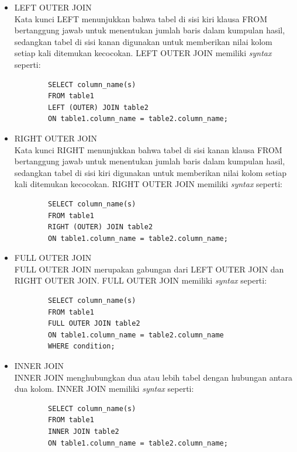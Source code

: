 \begin{itemize}
    \item LEFT OUTER JOIN \\
    Kata kunci LEFT menunjukkan bahwa tabel di sisi kiri klausa FROM bertanggung jawab untuk menentukan jumlah baris dalam kumpulan hasil, sedangkan tabel di sisi kanan digunakan untuk memberikan nilai kolom setiap kali ditemukan kecocokan. LEFT OUTER JOIN memiliki \textit{syntax} seperti:
    \begin{verbatim}
        SELECT column_name(s)
        FROM table1
        LEFT (OUTER) JOIN table2
        ON table1.column_name = table2.column_name;
    \end{verbatim}
    
    \item RIGHT OUTER JOIN \\
    Kata kunci RIGHT menunjukkan bahwa tabel di sisi kanan klausa FROM bertanggung jawab untuk menentukan jumlah baris dalam kumpulan hasil, sedangkan tabel di sisi kiri digunakan untuk memberikan nilai kolom setiap kali ditemukan kecocokan. RIGHT OUTER JOIN memiliki \textit{syntax} seperti:
    \begin{verbatim}
        SELECT column_name(s)
        FROM table1
        RIGHT (OUTER) JOIN table2
        ON table1.column_name = table2.column_name;
    \end{verbatim}
    
    \item FULL OUTER JOIN \\
    FULL OUTER JOIN merupakan gabungan dari LEFT OUTER JOIN dan RIGHT OUTER JOIN. FULL OUTER JOIN memiliki \textit{syntax} seperti:
    \begin{verbatim}
        SELECT column_name(s)
        FROM table1
        FULL OUTER JOIN table2
        ON table1.column_name = table2.column_name
        WHERE condition;
    \end{verbatim}
    
    \item INNER JOIN \\
    INNER JOIN menghubungkan dua atau lebih tabel dengan hubungan antara dua kolom. INNER JOIN memiliki \textit{syntax} seperti:
    \begin{verbatim}
        SELECT column_name(s)
        FROM table1
        INNER JOIN table2
        ON table1.column_name = table2.column_name;
    \end{verbatim}
\end{itemize}

